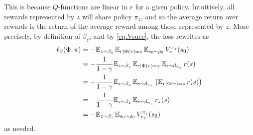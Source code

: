 \documentclass[11pt,a4paper]{article}
\begin{document}
\begin{dem}
This is because
$Q$-functions are linear in $r$ for a given policy. Intuitively, all
rewards represented by $z$ will share policy $\pi_z$, and so the
average return over rewards is the return of the average reward among
those represented by $z$. More precisely, by definition of $\beta_z$,
and by \eqref{eq:Vsucc},
the loss rewrites as
\begin{align}
\ell_\beta(\Phi,\pi)&=- \mathbb{E}_{z\sim \beta_z} \,\mathbb{E}_{r|\Phi(r)=z}\,\mathbb{E}_{s_0\sim \rho_0}\,
V^{\pi_z}_r(s_0)
\\&=- \frac{1}{1-\gamma}\mathbb{E}_{z\sim \beta_z}\, \mathbb{E}_{r|\Phi(r)=z}\,\mathbb{E}_{s\sim d_{\pi_z}}\,
 r(s)
\\&=- \frac{1}{1-\gamma}\mathbb{E}_{z\sim \beta_z}\, \mathbb{E}_{s\sim d_{\pi_z}}
\left(\mathbb{E}_{r|\Phi(r)=z}\, r(s)\right)
\\&=- \frac{1}{1-\gamma}\mathbb{E}_{z\sim \beta_z}\, \mathbb{E}_{s\sim d_{\pi_z}}
\, r_z(s)
\\&=- \mathbb{E}_{z\sim \beta_z}\, \mathbb{E}_{s_0\sim \rho_0}
\,V^{\pi_z}_{r_z}(s_0)
\end{align}
as needed.
\end{dem}
\end{document}
